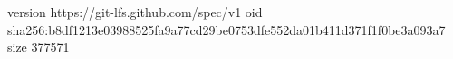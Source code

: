 version https://git-lfs.github.com/spec/v1
oid sha256:b8df1213e03988525fa9a77cd29be0753dfe552da01b411d371f1f0be3a093a7
size 377571
